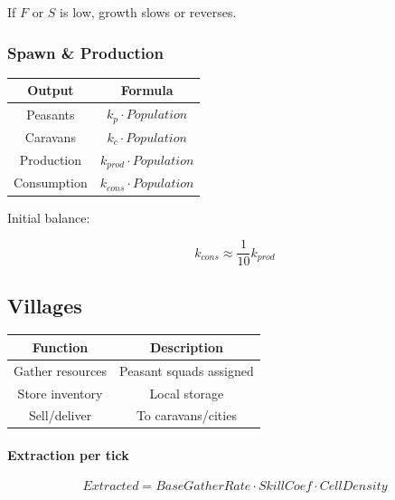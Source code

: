 If $F$ or $S$ is low, growth slows or reverses.



\subsubsection{Spawn \& Production}

\begin{table}[H]
\centering
\begin{tabular}{|c|c|}
\hline
Output & Formula \\
\hline
Peasants & $k_p \cdot Population$ \\
Caravans & $k_c \cdot Population$ \\
Production & $k_{prod} \cdot Population$ \\
Consumption & $k_{cons} \cdot Population$ \\
\hline
\end{tabular}
\end{table}

Initial balance:

\begin{equation}
k_{cons} \approx \frac{1}{10} k_{prod}
\end{equation}



\subsection{Villages}

\begin{table}[H]
\centering
\begin{tabular}{|c|c|}
\hline
Function & Description \\
\hline
Gather resources & Peasant squads assigned \\
Store inventory & Local storage \\
Sell/deliver & To caravans/cities \\
\hline
\end{tabular}
\end{table}

\paragraph{Extraction per tick}

\begin{equation}
Extracted = BaseGatherRate \cdot SkillCoef \cdot CellDensity
\end{equation}



